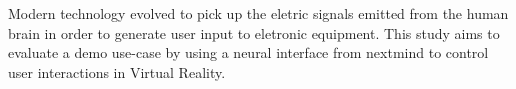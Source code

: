 



\usepackage[utf8]{inputenc} %





\newcommand{\vorname}{Julius}
\newcommand{\nachname}{Neudecker}
\newcommand{\matrikelnummer}{2025850}

\newcommand{\titel}{{[Working Title] Using a neural interface for interaction in virtual reality}\\[0.2ex] 
				\Large an HCI study}

\newcommand{\erstpruef}{Prof. Dr.Roland Greule}
\newcommand{\zweitpruef}{Dipl. Inf. Rüdiger Höfert}

\date{preliminary version from \today}   %



    \maketitle
    \tableofcontents
    \clearpage          %


    \thispagestyle{empty}
    \section*{\centering\abstractname}
    Modern technology evolved to pick up the eletric signals emitted from the human brain in order to generate user input to eletronic equipment. This study aims to evaluate a demo use-case by using a neural interface from nextmind to control user interactions in Virtual Reality.


